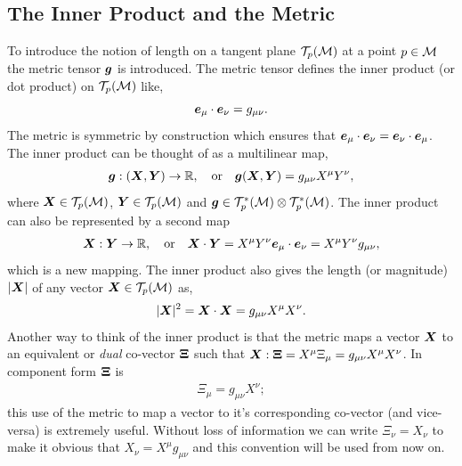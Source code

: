 \subsection{The Inner Product and the Metric} \label{intro:sec:dotprod}
To introduce the notion of length on a tangent plane $\mathcal{T}_p(\mathcal{M})$ at a point $p\in\mathcal{M}$ the metric tensor $\boldsymbol{g}$ is introduced. The metric tensor defines the inner product (or dot product) on $\mathcal{T}_p(\mathcal{M})$ like,
\begin{equation}
 \boldsymbol{e}_\mu \cdot \boldsymbol{e}_\nu=g_{\mu\nu}.
\end{equation}
The metric is symmetric by construction which ensures that $\boldsymbol{e}_\mu \cdot \boldsymbol{e}_\nu=\boldsymbol{e}_\nu \cdot \boldsymbol{e}_\mu$. The inner product can be thought of as a multilinear map,
\begin{gather}
\boldsymbol{g} : (\boldsymbol{X} , \boldsymbol{Y}) \rightarrow \mathbb{R} , \quad \mathrm{or} \quad
\boldsymbol{g}(\boldsymbol{X},\boldsymbol{Y}) = g_{\mu\nu} X^\mu Y^\nu,
\end{gather}
where $\boldsymbol{X}\in \mathcal{T}_p(\mathcal{M})$, $\boldsymbol{Y}\in \mathcal{T}_p(\mathcal{M})$ and $\boldsymbol{g}\in \mathcal{T}^*_p(\mathcal{M})\otimes  \mathcal{T}^*_p(\mathcal{M})$. The inner product can also be represented by a second map
\begin{gather}
\boldsymbol{X} : \boldsymbol{Y} \rightarrow \mathbb{R} , \quad \mathrm{or} \quad
\boldsymbol{X} \cdot \boldsymbol{Y} = X^\mu Y^\nu \boldsymbol{e}_\mu \cdot \boldsymbol{e}_\nu = X^\mu Y^\nu g_{\mu\nu},
\end{gather}
which is a new mapping. The inner product also gives the length (or magnitude) $|\boldsymbol{X}|$ of any vector $\boldsymbol{X}\in \mathcal{T}_p(\mathcal{M})$ as,
\begin{equation}
|\boldsymbol{X}|^2 = \boldsymbol{X} \cdot \boldsymbol{X} = g_{\mu\nu}X^\mu X^\nu.
\end{equation}
Another way to think of the inner product is that the metric maps a vector $\boldsymbol{X}$ to an equivalent or {\it dual} co-vector $\boldsymbol{\Xi}$ such that $\boldsymbol{X} : \boldsymbol{\Xi} = X^\mu \Xi_\mu= g_{\mu\nu}X^\mu X^\nu$. In component form $\boldsymbol{\Xi}$ is
\begin{align}
\Xi_\mu = g_{\mu\nu}X^\nu;
\end{align}
this use of the metric to map a vector to it's corresponding co-vector (and vice-versa) is extremely useful. Without loss of information we can write $\Xi_\nu = X_\nu$ to make it obvious that $X_\nu = X^\mu g_{\mu\nu}$ and this convention will be used from now on.

